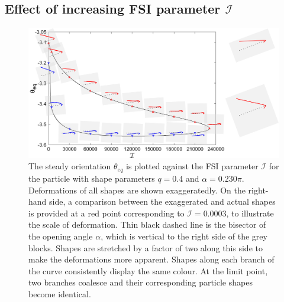 \documentclass[a4paper,12pt]{report}
\begin{document}
\subsection{Effect of increasing FSI parameter $\mathcal{I}$}
\begin{figure}[!h]
	\begin{center}
		\includegraphics[width=1\textwidth]{plot/RESLT_q_0.40_alpha_0.230pi_plot_step_refine2_new_recale_FSI/combine_elastic_beam_I_theta_q_0.40_alpha_0.230pi_initial_-4.80_refine2_15_new.png}
		\caption{The steady orientation $\theta_{eq}$ is plotted against the FSI parameter $\mathcal{I}$ for the particle with shape parameters $q = 0.4$ and $\alpha = 0.230\pi$. Deformations of all shapes are shown exaggeratedly. On the right-hand side, a comparison between the exaggerated and actual shapes is provided at a red point corresponding to $\mathcal{I}=0.0003$, to illustrate the scale of deformation. Thin black dashed line is the bisector of the opening angle $\alpha$, which is vertical to the right side of the grey blocks. Shapes are stretched by a factor of two along this side to make the deformations more apparent. Shapes along each branch of the curve consistently display the same colour. At the limit point, two branches coalesce and their corresponding particle shapes become identical.}
		\label{fig:7}
	\end{center}
\end{figure}
\end{document}
